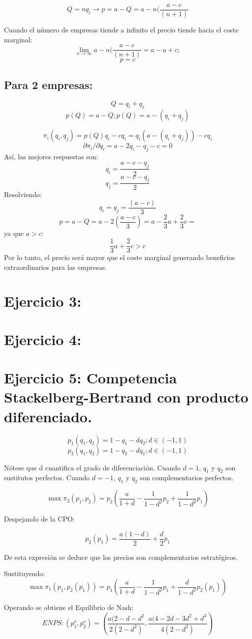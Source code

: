 \documentclass{article}
\theoremstyle{definition}
\theoremstyle{remark}
\begin{document}
$$Q=nq_i \rightarrow p=a-Q=a-n(\frac{a-c}{(n+1)}$$

Cuando el n\'umero de empresas tiende a infinito el precio tiende hacia el coste marginal:
$$\lim_{n\rightarrow \infty}a-n(\frac{a-c}{(n+1)}=a-a+c;$$
$$p=c$$

\subsection{Para 2 empresas:}

$$Q=q_i+q_j$$
$$p(Q)=a-Q; p(Q)=a-(q_i+q_j)$$

$$\pi_i(q_i,q_j)=p(Q)q_i-cq_i=q_i(a-(q_i+q_j))-cq_i$$
$$\partial \pi_i/\partial q_i= a-2q_i-q_j-c=0$$
As\'i, las mejores respuestas son:
$$q_i=\frac{a-c-q_j}{2}$$
$$q_j=\frac{a-c-q_j}{2}$$
Resolviendo:
$$q_i=q_j=\frac{(a-c)}{3}$$
$$p=a-Q=a-2(\frac{a-c}{3})=a-\frac{2}{3}a+\frac{2}{3}c=$$
ya que $a>c$:
$$\frac{1}{3}a+\frac{2}{3}c>c$$
Por lo tanto, el precio ser\'a mayor que el coste marginal generando beneficios extraordinarios para las empresas.

\section{Ejercicio 3:}
\section{Ejercicio 4:}
\section{Ejercicio 5: Competencia Stackelberg-Bertrand con producto diferenciado.}
$$p_1(q_1,q_2)=1-q_1-dq_2; d\in(-1,1)$$
$$p_2(q_1,q_2)=1-q_2-dq_1; d\in(-1,1)$$

N\'otese que d cuantifica el grado de diferenciaci\'on. Cuando $d=1$, $q_1$ y $q_2$ son sustitutos perfectos. Cuando  $d=-1$, $q_1$ y $q_2$ son complementarios perfectos.

$$\max\pi_2(p_1,p_2)=p_2(\frac{a}{1+d}-\frac{1}{1-d^2}p_2+\frac{1}{1-d^2}p_1)$$

Despejando de la CPO:

$$p_2(p_1)=\frac{a(1-d)}{2}+\frac{d}{2}p_1$$

De esta expresi\'on se deduce que los precios son complementarios estrat\'egicos.

Sustituyendo:
$$\max\pi_1(p_1,p_2(p_1))=p_1(\frac{a}{1+d}-\frac{1}{1-d^2}p_1+\frac{d}{1-d^2}p_2(p_1))$$

Operando se obtiene el Equilibrio de Nash:
$$ENPS:(p_1^s,p_2^s)=(\frac{a(2-d-d^2}{2(2-d^2)},\frac{a(4-2d-3d^2+d^3}{4(2-d^2)})$$
\end{document}
